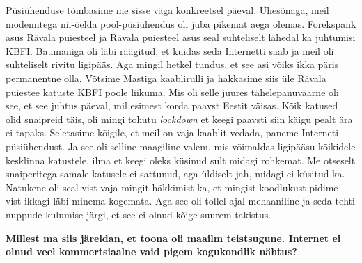 Püsiühenduse tõmbasime me sisse väga konkreetsel päeval. Ühesõnaga, meil 
modemitega nii-öelda pool-püsiühendus oli juba pikemat aega olemas.  
Forekspank asus Rävala puiesteel ja Rävala puiesteel asus seal suhteliselt 
lähedal ka juhtumisi KBFI. Baumaniga 
oli läbi räägitud, et kuidas seda Internetti saab ja meil oli suhteliselt 
rivitu ligipääs. Aga mingil hetkel tundus, et see asi võiks ikka päris 
permanentne olla. Võtsime Mastiga kaablirulli ja 
hakkasime siis üle Rävala puiestee katuste KBFI poole liikuma. Mis oli selle 
juures tähelepanuväärne oli see, et see juhtus päeval, mil esimest korda paavst 
Eestit väisas. 
Kõik katused olid snaipreid täis, oli mingi tohutu 
\emph{lockdown} et keegi paavsti siin käigu pealt ära ei tapaks.  
Seletasime kõigile, et meil on vaja kaablit vedada,  paneme Interneti 
püsiühendust. Ja see oli selline maagiline valem, mis  võimaldas ligipääsu 
kõikidele kesklinna katustele, ilma et keegi oleks küsinud sult midagi 
rohkemat. Me otseselt snaiperitega samale katusele ei sattunud, aga üldiselt 
jah, midagi ei küsitud ka. Natukene oli seal vist vaja mingit häkkimist ka, et 
mingist koodlukust pidime vist ikkagi läbi minema kogemata. Aga see oli tollel 
ajal mehaaniline ja seda tehti nuppude kulumise järgi, et see ei olnud kõige 
suurem takistus. 

\textbf{Millest ma siis järeldan, et toona oli maailm teistsugune. Internet ei 
olnud veel kommertsiaalne vaid pigem kogukondlik nähtus?}

